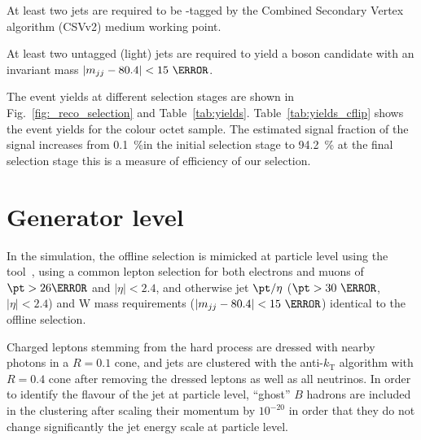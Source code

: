 At least two jets are required to be \cPqb-tagged by the Combined Secondary Vertex algorithm (CSVv2) medium working point. 

At least two untagged (light) jets are required to yield a \PW boson candidate with an invariant mass $\left|m_{jj}-80.4\right|<15~\GeV$.

The event yields at different selection stages are shown in Fig.~\ref{fig:_reco_selection} and Table~\ref{tab:yields}. Table~\ref{tab:yields_cflip} shows the event yields for the colour octet \PW sample. The estimated signal fraction of the signal increases from 0.1~\%in the initial selection stage to 94.2~\% at the final selection stage \textendash this is a measure of efficiency of our selection.







\section{Generator level}
\label{sec:generator_level}

In the simulation, the offline selection is mimicked at particle level using the \PSEUDOTOPPRODUCER tool~\cite{code:pseudotop}, using a common lepton selection for both electrons and muons of $\pt>26\GeV$ and $|\eta|<2.4$, and otherwise jet $\pt/\eta$ ($\pt>30~\GeV$, $|\eta|<2.4$) and W mass requirements ($\left|m_{jj}-80.4\right|<15~\GeV$) identical to the offline selection.

Charged leptons stemming from the hard process are dressed with nearby photons in a $R=0.1$ cone, and jets are clustered with the anti-$k_\text{T}$ algorithm with  $R=0.4$ cone after removing the dressed leptons as well as all neutrinos. In order to identify the flavour of the jet at particle level, ``ghost'' $B$ hadrons are included in the clustering after scaling their momentum by $10^{-20}$ in order that they do not change significantly the jet energy scale at particle level.
